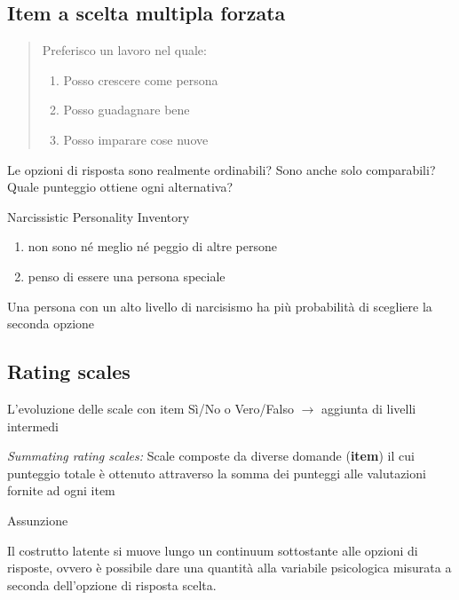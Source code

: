 \documentclass[compress]{beamer}
\begin{document}
\subsection*{Item a scelta multipla forzata}
\begin{frame}{}
	
	\begin{quote}
		
		Preferisco un lavoro nel quale: 
		
		\begin{enumerate}
			\item Posso crescere come persona
			\item Posso guadagnare bene
			\item Posso imparare cose nuove
		\end{enumerate}
	\end{quote}
	
	
	\vspace{2.5mm}
	Le opzioni di risposta sono realmente ordinabili? Sono anche solo comparabili? Quale punteggio ottiene ogni alternativa?
	

	\begin{exampleblock}{Narcissistic Personality Inventory}
		\begin{enumerate}
			\item non sono né meglio né peggio di altre persone
			\item penso di essere una persona speciale 
		\end{enumerate}
		

		Una persona con un alto livello di narcisismo ha più probabilità di scegliere la seconda opzione
	\end{exampleblock}
\end{frame}

\subsection*{Rating scales}
\begin{frame}
	
	L'evoluzione delle scale con item Sì/No o Vero/Falso $\rightarrow$ aggiunta di livelli intermedi
	
	\emph{Summating rating scales:} Scale composte da diverse domande (\textbf{item}) il cui punteggio totale è ottenuto attraverso la somma dei punteggi alle valutazioni fornite ad ogni item
	
	\begin{block}{Assunzione}
		
		Il costrutto latente si muove lungo un continuum sottostante alle opzioni di risposte, ovvero è possibile dare una quantità alla variabile psicologica misurata a seconda dell'opzione di risposta scelta. 
	\end{block}
	
	
\end{frame}
\end{document}
